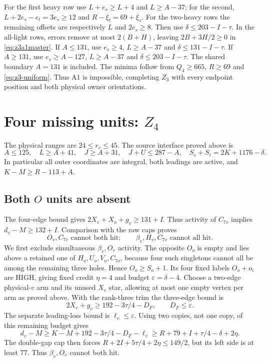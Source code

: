 \documentclass[11pt,letterpaper]{article}
\theoremstyle{definition}\newtheorem{definition}[theorem]{Definition}
\begin{document}
For the first heavy row use $L+e_s\ge L+4$ and $L\ge A-37$; for the second, $L+2e_s-e_t=3e_s\ge12$ and $R-\xi_t=69+\xi_s$. For the two-heavy rows the remaining offsets are respectively $L$ and $2e_s\ge8$. Then use $\delta\le203-I-\tau$.
In the all-light rows, errors remove at most $2(B+H)$, leaving $2B+3H/2\ge0$ in \eqref{eq:z3a1master}. If $A\le131$, use $e_s\ge4$, $L\ge A-37$ and $\delta\le131-I-\tau$. If $A\ge131$, use $e_s\ge A-127$, $L\ge A-37$ and $\delta\le203-I-\tau$. The shared boundary $A=131$ is included. The minima follow from $Q_4\ge665$, $R\ge69$ and \eqref{eq:z3-uniform}. Thus A1 is impossible, completing $Z_3$ with every endpoint position and both physical owner orientations.


\section{Four missing units: $Z_4$}\label{sec:Z4}
The physical ranges are $24\le r_v\le45$. The source interface proved above is
\begin{equation}\label{eq:z4-source}
 A\le125,\quad L\ge A+41,\quad J\ge A+31,\quad J+U\le287-A,
 \quad S_s+S_t=2K+1176-\delta.
\end{equation}
In particular all outer coordinates are integral, both leadings are active, and
$K-M\ge R-113+A$.

\subsection{Both $O$ units are absent}
The four-edge bound gives $2X_v+X_o+g_v\ge131+I$. Thus activity of $C_{7v}$ implies $d_v-M\ge132+I$. Comparison with the raw caps proves
\[
 O_v,C_{7v}\text{ cannot both hit};\qquad
 \beta_v,H_v,C_{7v}\text{ cannot all hit}.
\]
We first exclude simultaneous $\beta_v,O_v$ activity. The opposite $O_o$ is empty and lies above a retained one of $H_o,U_o,V_o,C_{7o}$, because four such singletons cannot all be among the remaining three holes. Hence $O_o\ge S_o+1$. Its four fixed labels $O_o+o_i$ are HIGH, giving fixed credit $\eta=4$ and budget $\varepsilon=\delta-4$.
Choose a two-edge physical-$v$ arm and its unused $X_v$ star, allowing at most one empty vertex per arm as proved above. With the rank-three trim the three-edge bound is
\[
 2X_v+g_v\ge192-3\tau/4-D_F,\qquad D_F\le\varepsilon.
\]
The separate leading-loss bound is $\ell_v\le\varepsilon$. Using two copies, not one copy, of this remaining budget gives
\[
 d_v-M\ge K-M+192-3\tau/4-D_F-\ell_v
 \ge R+79+I+\tau/4-\delta+2\eta.
\]
The double-gap cap then forces $R+2I+5\tau/4+2\eta\le149/2$, but its left side is at least $77$. Thus $\beta_v,O_v$ cannot both hit.
\end{document}
